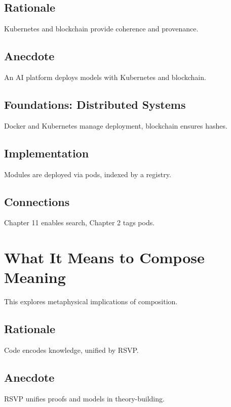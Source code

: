\documentclass[12pt]{article}
\begin{document}
\subsection{Rationale}
Kubernetes and blockchain provide coherence and provenance.

\subsection{Anecdote}
An AI platform deploys models with Kubernetes and blockchain.

\subsection{Foundations: Distributed Systems}
Docker and Kubernetes manage deployment, blockchain ensures hashes.

\subsection{Implementation}
Modules are deployed via pods, indexed by a registry.

\begin{center}
\end{center}

\subsection{Connections}
Chapter 11 enables search, Chapter 2 tags pods.

\section{What It Means to Compose Meaning}
\label{sec:chapter13}

This explores metaphysical implications of composition.

\subsection{Rationale}
Code encodes knowledge, unified by RSVP.

\subsection{Anecdote}
RSVP unifies proofs and models in theory-building.
\end{document}
